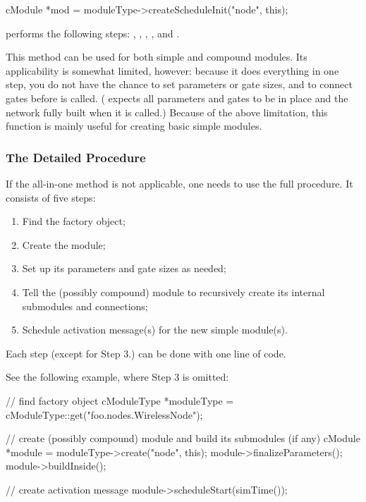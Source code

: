 \begin{cpp}
cModule *mod = moduleType->createScheduleInit("node", this);
\end{cpp}

 performs the following steps: ,
, ,
, and .

This method can be used for both simple and compound modules. Its
applicability is somewhat limited, however: because it does everything in
one step, you do not have the chance to set parameters or gate sizes, and
to connect gates before  is called.
( expects all parameters and gates to be in place and
the network fully built when it is called.) Because of the above
limitation, this function is mainly useful for creating basic simple
modules.


\subsubsection{The Detailed Procedure}
\label{sec:simple-modules:dynamic-creation:details}

If the  all-in-one method is not applicable,
one needs to use the full procedure. It consists of five steps:

\begin{enumerate}
  \item Find the factory object;
  \item Create the module;
  \item Set up its parameters and gate sizes as needed;
  \item Tell the (possibly compound) module to recursively create
        its internal submodules and connections;
  \item Schedule activation message(s) for the new simple module(s).
\end{enumerate}

Each step (except for Step 3.) can be done with one line of code.

See the following example, where Step 3 is omitted:

\begin{cpp}
// find factory object
cModuleType *moduleType = cModuleType::get("foo.nodes.WirelessNode");

// create (possibly compound) module and build its submodules (if any)
cModule *module = moduleType->create("node", this);
module->finalizeParameters();
module->buildInside();

// create activation message
module->scheduleStart(simTime());
\end{cpp}

